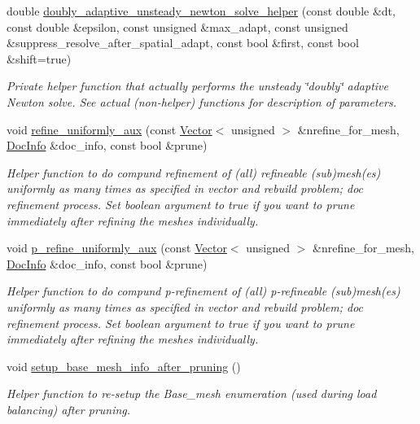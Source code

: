 \begin{DoxyCompactItemize}
\item 
double \hyperlink{classoomph_1_1Problem_a71ba0a8ba4cbcb66077324217482ee11}{doubly\+\_\+adaptive\+\_\+unsteady\+\_\+newton\+\_\+solve\+\_\+helper} (const double \&dt, const double \&epsilon, const unsigned \&max\+\_\+adapt, const unsigned \&suppress\+\_\+resolve\+\_\+after\+\_\+spatial\+\_\+adapt, const bool \&first, const bool \&shift=true)
\begin{DoxyCompactList}\small\item\em Private helper function that actually performs the unsteady \char`\"{}doubly\char`\"{} adaptive Newton solve. See actual (non-\/helper) functions for description of parameters. \end{DoxyCompactList}\item 
void \hyperlink{classoomph_1_1Problem_a0f86f3d5d65115dca81e10910e11ea19}{refine\+\_\+uniformly\+\_\+aux} (const \hyperlink{classoomph_1_1Vector}{Vector}$<$ unsigned $>$ \&nrefine\+\_\+for\+\_\+mesh, \hyperlink{classoomph_1_1DocInfo}{Doc\+Info} \&doc\+\_\+info, const bool \&prune)
\begin{DoxyCompactList}\small\item\em Helper function to do compund refinement of (all) refineable (sub)mesh(es) uniformly as many times as specified in vector and rebuild problem; doc refinement process. Set boolean argument to true if you want to prune immediately after refining the meshes individually. \end{DoxyCompactList}\item 
void \hyperlink{classoomph_1_1Problem_a9e598cc12a894db00bfe62d87a0ff41b}{p\+\_\+refine\+\_\+uniformly\+\_\+aux} (const \hyperlink{classoomph_1_1Vector}{Vector}$<$ unsigned $>$ \&nrefine\+\_\+for\+\_\+mesh, \hyperlink{classoomph_1_1DocInfo}{Doc\+Info} \&doc\+\_\+info, const bool \&prune)
\begin{DoxyCompactList}\small\item\em Helper function to do compund p-\/refinement of (all) p-\/refineable (sub)mesh(es) uniformly as many times as specified in vector and rebuild problem; doc refinement process. Set boolean argument to true if you want to prune immediately after refining the meshes individually. \end{DoxyCompactList}\item 
void \hyperlink{classoomph_1_1Problem_ab5f60ebc552c00ee681776bc7fa61203}{setup\+\_\+base\+\_\+mesh\+\_\+info\+\_\+after\+\_\+pruning} ()
\begin{DoxyCompactList}\small\item\em Helper function to re-\/setup the Base\+\_\+mesh enumeration (used during load balancing) after pruning. \end{DoxyCompactList}\item 

\end{DoxyCompactItemize}
